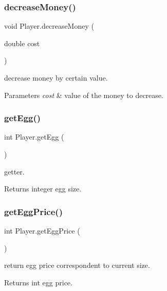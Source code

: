 \subsubsection{\texorpdfstring{decrease\+Money()}{decreaseMoney()}}
{\footnotesize\ttfamily void Player.\+decrease\+Money (\begin{DoxyParamCaption}\item[{double}]{cost }\end{DoxyParamCaption})\hspace{0.3cm}{\ttfamily [inline]}}

decrease money by certain value. 
\begin{DoxyParams}{Parameters}
{\em cost} & value of the money to decrease. \\
\hline
\end{DoxyParams}
\mbox{\label{class_player_a3845f8524497669aefc7a89c5e5f7e7f}} 
\subsubsection{\texorpdfstring{get\+Egg()}{getEgg()}}
{\footnotesize\ttfamily int Player.\+get\+Egg (\begin{DoxyParamCaption}{ }\end{DoxyParamCaption})\hspace{0.3cm}{\ttfamily [inline]}}

getter. \begin{DoxyReturn}{Returns}
integer egg size. 
\end{DoxyReturn}
\mbox{\label{class_player_a49009dfbdc77841a389ab9f9d84ff2e2}} 
\subsubsection{\texorpdfstring{get\+Egg\+Price()}{getEggPrice()}}
{\footnotesize\ttfamily int Player.\+get\+Egg\+Price (\begin{DoxyParamCaption}{ }\end{DoxyParamCaption})\hspace{0.3cm}{\ttfamily [inline]}}

return egg price correspondent to current size. \begin{DoxyReturn}{Returns}
int egg price. 
\end{DoxyReturn}
\mbox{\label{class_player_a92a543d59ea6cb11b01f424f8957f58c}} 
